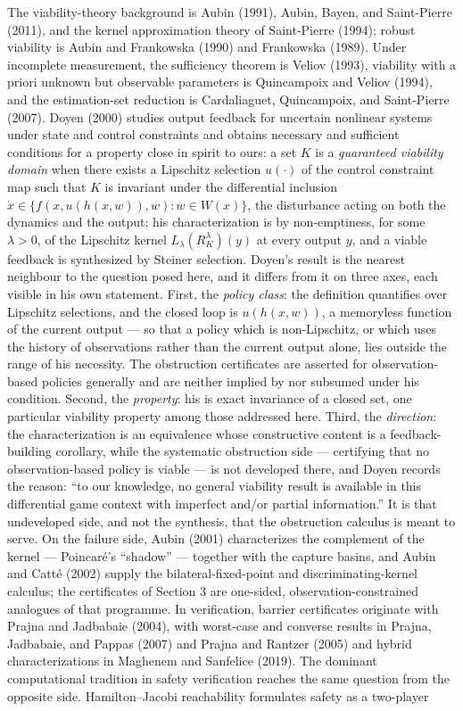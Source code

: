 \documentclass[10pt,twocolumn]{article}
\theoremstyle{definition}
\begin{document}
The viability-theory background is Aubin (1991), Aubin, Bayen, and Saint-Pierre (2011), and the kernel approximation theory of Saint-Pierre (1994); robust viability is Aubin and Frankowska (1990) and Frankowska (1989). Under incomplete measurement, the sufficiency theorem is Veliov (1993), viability with a priori unknown but observable parameters is Quincampoix and Veliov (1994), and the estimation-set reduction is Cardaliaguet, Quincampoix, and Saint-Pierre (2007).  Doyen (2000) studies output feedback for uncertain nonlinear systems under state and control constraints and obtains necessary and sufficient conditions for a property close in spirit to ours: a set \(K\) is a \emph{guaranteed viability domain} when there exists a Lipschitz selection
\(u(\cdot)\) of the control constraint map such that \(K\) is invariant under the
differential inclusion \(\dot x \in \{f(x,u(h(x,w)),w): w \in W(x)\}\), the disturbance
acting on both the dynamics and the output; his characterization is by non-emptiness, for
some \(\lambda>0\), of the Lipschitz kernel \(L_{\lambda}(R^{\lambda}_{K})(y)\) at every
output \(y\), and a viable feedback is synthesized by Steiner selection.  Doyen's result is
the nearest neighbour to the question posed here, and it differs from it on three axes, each
visible in his own statement.  First, the \emph{policy class}: the definition quantifies over
Lipschitz selections, and the closed loop is \(u(h(x,w))\), a memoryless function of the
current output --- so that a policy which is non-Lipschitz, or which uses the history of
observations rather than the current output alone, lies outside the range of his necessity.
The obstruction certificates are asserted for observation-based policies generally and are
neither implied by nor subsumed under his condition.  Second, the \emph{property}: his is
exact invariance of a closed set, one particular viability property among those addressed
here.  Third, the \emph{direction}: the characterization is an equivalence whose constructive
content is a feedback-building corollary, while the systematic obstruction side ---
certifying that no observation-based policy is viable --- is not developed there, and Doyen
records the reason: ``to our knowledge, no general viability result is available in this
differential game context with imperfect and/or partial information.''  It is that
undeveloped side, and not the synthesis, that the obstruction calculus is meant to serve. On the failure side, Aubin (2001) characterizes the complement of the kernel --- Poincar\'e's ``shadow'' --- together with the capture basins, and Aubin and Catt\'e (2002) supply the bilateral-fixed-point and discriminating-kernel calculus; the certificates of Section 3 are one-sided, observation-constrained analogues of that programme. In verification, barrier certificates originate with Prajna and Jadbabaie (2004), with worst-case and converse results in Prajna, Jadbabaie, and Pappas (2007) and Prajna and Rantzer (2005) and hybrid characterizations in Maghenem and Sanfelice (2019). The dominant computational tradition in safety verification reaches the same question from the opposite side.  Hamilton--Jacobi reachability formulates safety as a two-player
\end{document}
